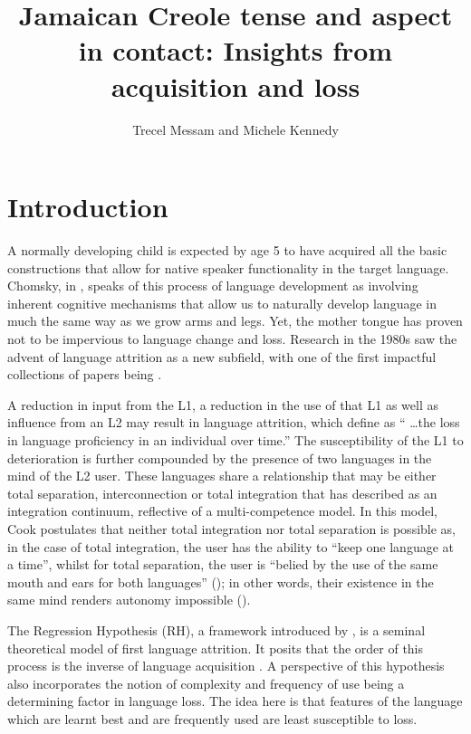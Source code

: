 \documentclass[output=paper,colorlinks,citecolor=brown]{langscibook}
\author{Trecel Messam\affiliation{University of the West Indies, Mona} and Michele Kennedy\affiliation{University of the West Indies, Mona}}
\title{Jamaican Creole tense and aspect in contact: Insights from acquisition and loss}
\begin{document}
\maketitle




\section{Introduction} \label{sec:messamk:1}
A normally developing child is expected by age 5 to have acquired all the basic constructions that allow for native speaker functionality in the target language. Chomsky, in \citet{cockburn1994goldenage}, speaks of this process of language development as involving inherent cognitive mechanisms that allow us to naturally develop language in much the same way as we grow arms and legs. Yet, the mother tongue has proven not to be impervious to language change and loss. Research in the 1980s saw the advent of language attrition as a new subfield, with one of the first impactful collections of papers being \citet{LambertFreed1982}.

A reduction in input from the L1, a reduction in the use of that L1 as well as influence from an L2 may result in language attrition, which  \citet[11]{DeBotSchrauf2009} define as “ …the loss in language proficiency in an individual over time.” The susceptibility of the L1 to deterioration is further compounded by the presence of two languages in the mind of the L2 user. These languages share a relationship that may be either total separation, interconnection or total integration that \citet{Cook2002,Cook2003,Cook2016} has described as an integration continuum, reflective of a multi-competence model. In this model, Cook postulates that neither total integration nor total separation is possible as, in the case of total integration, the user has the ability to “keep one language at a time”, whilst for total separation, the user is “belied by the use of the same mouth and ears for both languages” (\citeyear[12]{Cook2002}); in other words, their existence in the same mind renders autonomy impossible (\citeyear[7]{Cook2003}).

The Regression Hypothesis (RH), a framework introduced by \citet{Jakobson1941}, is a seminal theoretical model of first language attrition. It posits that the order of this process is the inverse of language acquisition \citep{Schmitt2019}. A perspective of this hypothesis also incorporates the notion of complexity and frequency of use being a determining factor in language loss. The idea here is that features of the language which are learnt best and are frequently used are least susceptible to loss.
\end{document}
